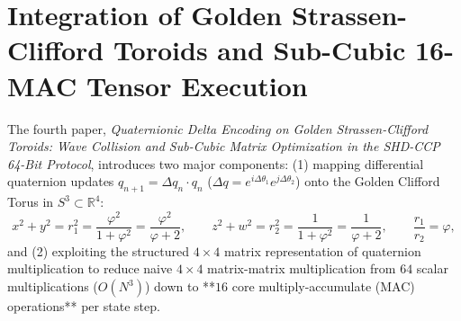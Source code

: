 \documentclass[11pt, a4paper]{article}
\begin{document}
\section{Integration of Golden Strassen-Clifford Toroids and Sub-Cubic 16-MAC Tensor Execution}

The fourth paper, \textit{Quaternionic Delta Encoding on Golden Strassen-Clifford Toroids: Wave Collision and Sub-Cubic Matrix Optimization in the SHD-CCP 64-Bit Protocol}, introduces two major components: (1) mapping differential quaternion updates $q_{n+1} = \Delta q_n \cdot q_n$ ($\Delta q = e^{i\Delta\theta_1} e^{j\Delta\theta_2}$) onto the Golden Clifford Torus in $S^3 \subset \mathbb{R}^4$:
\begin{equation}
x^2 + y^2 = r_1^2 = \frac{\varphi^2}{1 + \varphi^2} = \frac{\varphi^2}{\varphi + 2}, \qquad z^2 + w^2 = r_2^2 = \frac{1}{1 + \varphi^2} = \frac{1}{\varphi + 2}, \qquad \frac{r_1}{r_2} = \varphi,
\end{equation}
and (2) exploiting the structured $4\times 4$ matrix representation of quaternion multiplication to reduce naive $4\times 4$ matrix-matrix multiplication from $64$ scalar multiplications ($O(N^3)$) down to **$16$ core multiply-accumulate (MAC) operations** per state step.
\end{document}

